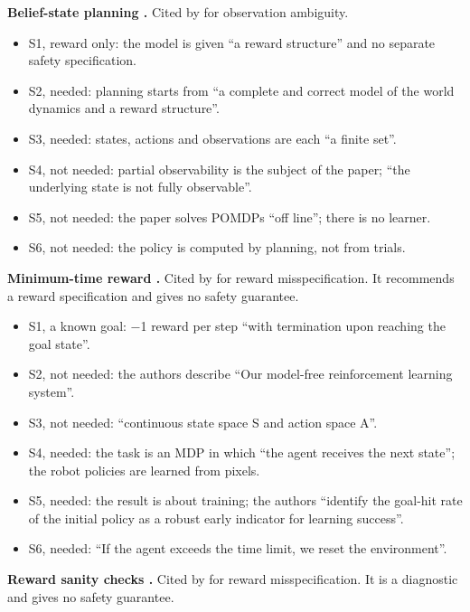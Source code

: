 \documentclass{article}
\providecommand{\tightlist}{\setlength{\itemsep}{0pt}\setlength{\parskip}{0pt}}
\begin{document}
\textbf{Belief-state planning \citep{kaelbling1998}.} Cited by \citet{mclean2026} for observation ambiguity.

\begin{itemize}
\tightlist
\item
  S1, reward only: the model is given ``a reward structure'' and no separate safety specification.
\item
  S2, needed: planning starts from ``a complete and correct model of the world dynamics and a reward structure''.
\item
  S3, needed: states, actions and observations are each ``a finite set''.
\item
  S4, not needed: partial observability is the subject of the paper; ``the underlying state is not fully observable''.
\item
  S5, not needed: the paper solves POMDPs ``off line''; there is no learner.
\item
  S6, not needed: the policy is computed by planning, not from trials.
\end{itemize}

\textbf{Minimum-time reward \citep{vasan2024}.} Cited by \citet{mclean2026} for reward misspecification. It recommends a reward specification and gives no safety guarantee.

\begin{itemize}
\tightlist
\item
  S1, a known goal: −1 reward per step ``with termination upon reaching the goal state''.
\item
  S2, not needed: the authors describe ``Our model-free reinforcement learning system''.
\item
  S3, not needed: ``continuous state space S and action space A''.
\item
  S4, needed: the task is an MDP in which ``the agent receives the next state''; the robot policies are learned from pixels.
\item
  S5, needed: the result is about training; the authors ``identify the goal-hit rate of the initial policy as a robust early indicator for learning success''.
\item
  S6, needed: ``If the agent exceeds the time limit, we reset the environment''.
\end{itemize}

\textbf{Reward sanity checks \citep{knox2023}.} Cited by \citet{mclean2026} for reward misspecification. It is a diagnostic and gives no safety guarantee.
\end{document}
